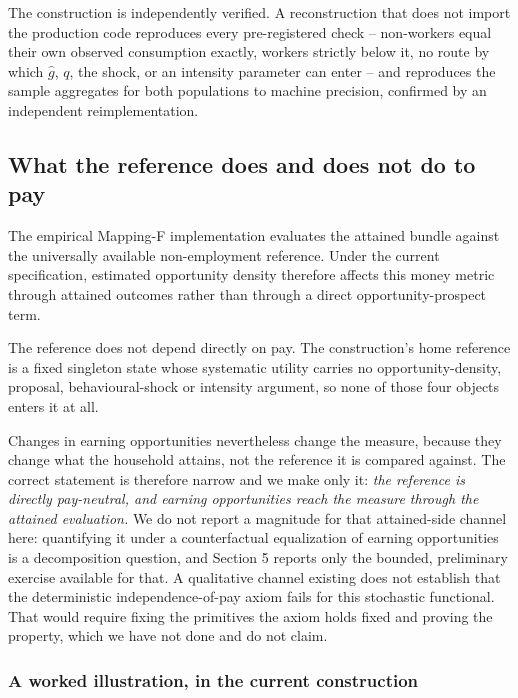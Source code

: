 \documentclass[11pt,a4paper]{article}
\begin{document}
The construction is independently verified. A reconstruction that does not import the production code reproduces every pre-registered check -- non-workers equal their own observed consumption exactly, workers strictly below it, no route by which \(\widehat g\), \(q\), the shock, or an intensity parameter can enter -- and reproduces the sample aggregates for both populations to machine precision, confirmed by an independent reimplementation.

\subsection{What the reference does and does not do to pay}\label{what-the-reference-does-and-does-not-do-to-pay}

The empirical Mapping-F implementation evaluates the attained bundle against the universally available non-employment reference. Under the current specification, estimated opportunity density therefore affects this money metric through attained outcomes rather than through a direct opportunity-prospect term.

The reference does not depend directly on pay. The construction's home reference is a fixed singleton state whose systematic utility carries no opportunity-density, proposal, behavioural-shock or intensity argument, so none of those four objects enters it at all.

Changes in earning opportunities nevertheless change the measure, because they change what the household attains, not the reference it is compared against. The correct statement is therefore narrow and we make only it: \emph{the reference is directly pay-neutral, and earning opportunities reach the measure through the attained evaluation.} We do not report a magnitude for that attained-side channel here: quantifying it under a counterfactual equalization of earning opportunities is a decomposition question, and Section 5 reports only the bounded, preliminary exercise available for that. A qualitative channel existing does not establish that the deterministic independence-of-pay axiom fails for this stochastic functional. That would require fixing the primitives the axiom holds fixed and proving the property, which we have not done and do not claim.

\subsubsection{A worked illustration, in the current construction}\label{a-worked-illustration-in-the-current-construction}
\end{document}
